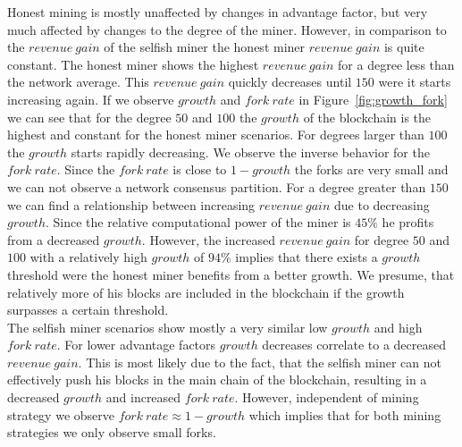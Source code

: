 Honest mining is mostly unaffected by changes in advantage factor, but very much affected by changes to the degree of the miner. However, in comparison to the $revenue~gain$ of the selfish miner the honest miner $revenue~gain$ is quite constant. The honest miner shows the highest $revenue~gain$ for a degree less than the network average. This $revenue~gain$ quickly decreases until $150$ were it starts increasing again. If we observe $growth$ and $fork~rate$ in Figure~\ref{fig:growth_fork} we can see that for the degree $50$ and $100$ the $growth$ of the blockchain is the highest and constant for the honest miner scenarios. For degrees larger than $100$ the $growth$ starts rapidly decreasing. We observe the inverse behavior for the $fork~rate$. Since the $fork~rate$ is close to $1-growth$ the forks are very small and we can not observe a network consensus partition. For a degree greater than $150$ we can find a relationship between increasing $revenue~gain$ due to decreasing $growth$. Since the relative computational power of the miner is $45\% $ he profits from a decreased $growth$. However, the increased $revenue~gain$ for degree $50$ and $100$ with a relatively high $growth$ of $94\% $ implies that there exists a $growth$ threshold were the honest miner benefits from a better growth. We presume, that relatively more of his blocks are included in the blockchain if the growth surpasses a certain threshold.\\
The selfish miner scenarios show mostly a very similar low $growth$ and high $fork~rate$. For lower advantage factors $growth$ decreases correlate to a decreased $revenue~gain$. This is most likely due to the fact, that the selfish miner can not effectively push his blocks in the main chain of the blockchain, resulting in a decreased $growth$ and increased $fork~rate$. However, independent of mining strategy we observe $fork~rate \approx 1-growth$ which implies that for both mining strategies we only observe small forks.

